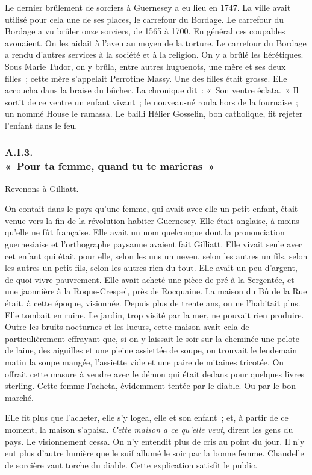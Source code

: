 \documentclass[french,twoside]{book} %
\begin{document}
Le dernier brûlement de sorciers à Guernesey a eu lieu en 1747. La ville avait utilisé pour cela une de ses places, le carrefour du Bordage. Le carrefour du Bordage a vu brûler onze sorciers, de 1565 à 1700. En général ces coupables avouaient. On les aidait à l’aveu au moyen de la torture. Le carrefour du Bordage a rendu d’autres services à la société et à la religion. On y a brûlé les hérétiques. Sous Marie Tudor, on y brûla, entre autres huguenots, une mère et ses deux filles ; cette mère s’appelait Perrotine Massy. Une des filles était grosse. Elle accoucha dans la braise du bûcher. La chronique dit : « Son ventre éclata. » Il sortit de ce ventre un enfant vivant ; le nouveau-né roula hors de la fournaise ; un nommé House le ramassa. Le bailli Hélier Gosselin, bon catholique, fit rejeter l’enfant dans le feu.
 \subsubsection[{A.I.3. « Pour ta femme, quand tu te marieras »}]{A.I.3. \\
« Pour ta femme, quand tu te marieras »}
\noindent Revenons à Gilliatt.\par
On contait dans le pays qu’une femme, qui avait avec elle un petit enfant, était venue vers la fin de la révolution habiter Guernesey. Elle était anglaise, à moins qu’elle ne fût française. Elle avait un nom quelconque dont la prononciation guernesiaise et l’orthographe paysanne avaient fait Gilliatt. Elle vivait seule avec cet enfant qui était pour elle, selon les uns un neveu, selon les autres un fils, selon les autres un petit-fils, selon les autres rien du tout. Elle avait un peu d’argent, de quoi vivre pauvrement. Elle avait acheté une pièce de pré à la Sergentée, et une jaonnière à la Roque-Crespel, près de Rocquaine. La maison du Bû de la Rue était, à cette époque, visionnée. Depuis plus de trente ans, on ne l’habitait plus. Elle tombait en ruine. Le jardin, trop visité par la mer, ne pouvait rien produire. Outre les bruits nocturnes et les lueurs, cette maison avait cela de particulièrement effrayant  que, si on y laissait le soir sur la cheminée une pelote de laine, des aiguilles et une pleine assiettée de soupe, on trouvait le lendemain matin la soupe mangée, l’assiette vide et une paire de mitaines tricotée. On offrait cette masure à vendre avec le démon qui était dedans pour quelques livres sterling. Cette femme l’acheta, évidemment tentée par le diable. Ou par le bon marché.\par
Elle fit plus que l’acheter, elle s’y logea, elle et son enfant ; et, à partir de ce moment, la maison s’apaisa. \emph{Cette maison a ce qu’elle veut}, dirent les gens du pays. Le visionnement cessa. On n’y entendit plus de cris au point du jour. Il n’y eut plus d’autre lumière que le suif allumé le soir par la bonne femme. Chandelle de sorcière vaut torche du diable. Cette explication satisfit le public.\par
\end{document}

